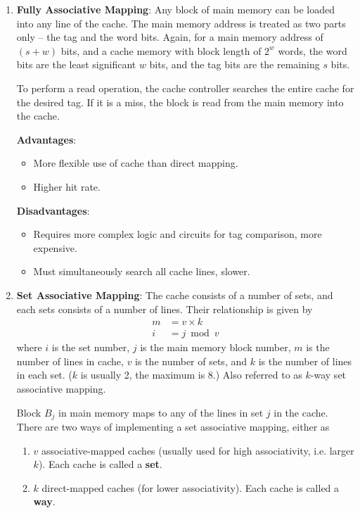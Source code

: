 \begin{enumerate}
\item \textbf{Fully Associative Mapping}:
    Any block of main memory can be loaded into any line of the cache. The main memory
    address is treated as two parts only -- the tag and the word bits. Again, for a main
    memory address of $(s+w)$ bits, and a cache memory with block length of $2^w$ words,
    the word bits are the least significant $w$ bits, and the tag bits are the remaining
    $s$ bits.

    To perform a read operation, the cache controller searches the entire cache for the
    desired tag. If it is a miss, the block is read from the main memory into the cache.

    \begin{multicols}{2}
        \textbf{Advantages}: \begin{itemize}
            \item More flexible use of cache than direct mapping.
            \item Higher hit rate.
        \end{itemize}
        \columnbreak
        \textbf{Disadvantages}: \begin{itemize}
            \item Requires more complex logic and circuits for tag comparison, more expensive.
            \item Must simultaneously search all cache lines, slower.
        \end{itemize}
    \end{multicols}

\item \textbf{Set Associative Mapping}:
    The cache consists of a number of sets, and each sets consists of a number of lines.
    Their relationship is given by
    \begin{align*}
        m &= v \times k \\
        i &= j \bmod v
    \end{align*}
    where $i$ is the set number, $j$ is the main memory block number, $m$ is the number
    of lines in cache, $v$ is the number of sets, and $k$ is the number of lines in each set.
    ($k$ is usually 2, the maximum is 8.) Also referred to as $k$-way set associative mapping.

    Block $B_j$ in main memory maps to any of the lines in set $j$ in the cache. There are
    two ways of implementing a set associative mapping, either as
    \begin{enumerate}
        \item $v$ associative-mapped caches 
            (usually used for high associativity, i.e. larger $k$).
            Each cache is called a \textbf{set}.
        \item $k$ direct-mapped caches (for lower associativity).
            Each cache is called a \textbf{way}.
    \end{enumerate}


\end{enumerate}
